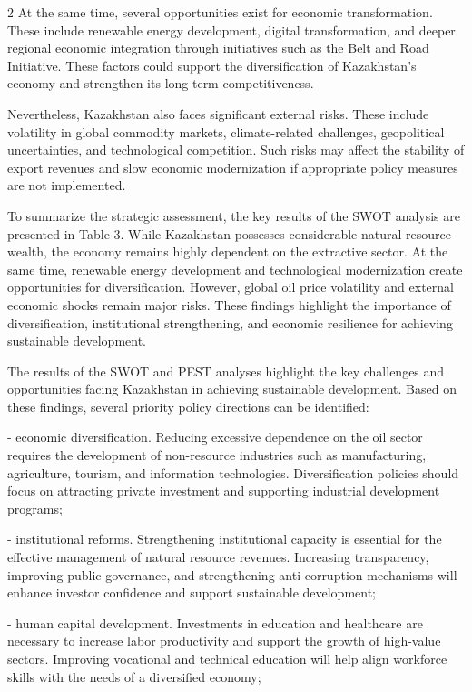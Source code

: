 \begin{multicols}{2}
At the same time, several opportunities exist for economic
transformation. These include renewable energy development, digital
transformation, and deeper regional economic integration through
initiatives such as the Belt and Road Initiative. These factors could
support the diversification of Kazakhstan's economy and strengthen its
long-term competitiveness.

Nevertheless, Kazakhstan also faces significant external risks. These
include volatility in global commodity markets, climate-related
challenges, geopolitical uncertainties, and technological competition.
Such risks may affect the stability of export revenues and slow economic
modernization if appropriate policy measures are not implemented.

To summarize the strategic assessment, the key results of the SWOT
analysis are presented in Table 3. While Kazakhstan possesses
considerable natural resource wealth, the economy remains highly
dependent on the extractive sector. At the same time, renewable energy
development and technological modernization create opportunities for
diversification. However, global oil price volatility and external
economic shocks remain major risks. These findings highlight the
importance of diversification, institutional strengthening, and economic
resilience for achieving sustainable development.

The results of the SWOT and PEST analyses highlight the key challenges
and opportunities facing Kazakhstan in achieving sustainable
development. Based on these findings, several priority policy directions
can be identified:

- economic diversification. Reducing excessive dependence on the oil
sector requires the development of non-resource industries such as
manufacturing, agriculture, tourism, and information technologies.
Diversification policies should focus on attracting private investment
and supporting industrial development programs;

- institutional reforms. Strengthening institutional capacity is
essential for the effective management of natural resource revenues.
Increasing transparency, improving public governance, and strengthening
anti-corruption mechanisms will enhance investor confidence and support
sustainable development;

- human capital development. Investments in education and healthcare are
necessary to increase labor productivity and support the growth of
high-value sectors. Improving vocational and technical education will
help align workforce skills with the needs of a diversified economy;


\end{multicols}
